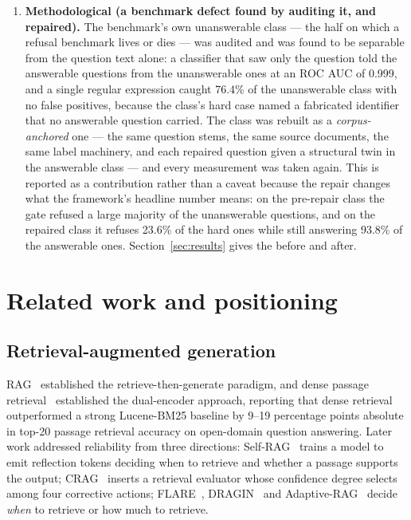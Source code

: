 \documentclass[preprint,3p,times]{elsarticle}
\begin{document}
\begin{enumerate}
evaluated as a selective-prediction policy, with a risk--coverage curve and a
false-positive rate at a stated operating point, with always-flag and
never-flag baselines, and with the calibration re-fitted for every retrieval
configuration compared.
\item \textbf{Methodological (a benchmark defect found by auditing it, and
repaired).} The benchmark's own unanswerable class --- the half on which a
refusal benchmark lives or dies --- was audited and was found to be separable
from the question text alone: a classifier that saw only the question told the
answerable questions from the unanswerable ones at an ROC AUC of
0.999, and a single regular expression caught
76.4\% of the unanswerable class with no false positives,
because the class's hard case named a fabricated identifier that no answerable
question carried. The class was rebuilt as a \emph{corpus-anchored} one ---
the same question stems, the same source documents, the same label
machinery, and each repaired question given a structural twin in the
answerable class --- and every measurement was taken again. This is reported
as a contribution rather than a caveat because the repair changes what the
framework's headline number means: on the pre-repair class the gate refused
a large majority of the unanswerable questions, and on the repaired class it
refuses 23.6\% of the hard ones while still answering
93.8\% of the answerable ones. Section~\ref{sec:results}
gives the before and after.
\end{enumerate}

\section{Related work and positioning}
\label{sec:related}

\subsection{Retrieval-augmented generation}

RAG~\cite{lewis2020rag} established the retrieve-then-generate paradigm, and
dense passage retrieval~\cite{karpukhin2020dpr} established the dual-encoder
approach, reporting that dense retrieval outperformed a strong Lucene-BM25
baseline by 9--19 percentage points absolute in top-20 passage retrieval
accuracy on open-domain question answering. Later work addressed reliability
from three directions: Self-RAG~\cite{asai2024selfrag} trains a model to emit
reflection tokens deciding when to retrieve and whether a passage supports the
output; CRAG~\cite{yan2024crag} inserts a retrieval evaluator whose confidence
degree selects among four corrective actions; FLARE~\cite{jiang2023flare},
DRAGIN~\cite{su2024dragin} and Adaptive-RAG~\cite{jeong2024adaptive} decide
\emph{when} to retrieve or how much to retrieve.
\end{document}
